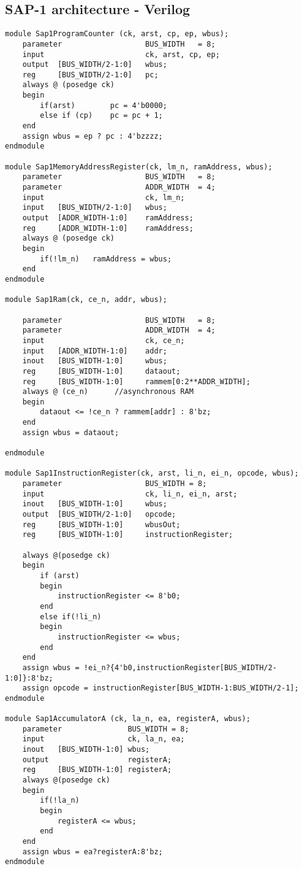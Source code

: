 \subsection{SAP-1 architecture - Verilog}
\lstset{language=Verilog,style=Verilogstyle}
\begin{lstlisting}[caption={SAP-1 architecture implemented in C},label=lst:sap1archverilog]
module Sap1ProgramCounter (ck, arst, cp, ep, wbus);
	parameter 					BUS_WIDTH 	= 8;
	input 						ck, arst, cp, ep;
	output	[BUS_WIDTH/2-1:0]	wbus;
	reg		[BUS_WIDTH/2-1:0]	pc;
	always @ (posedge ck)
	begin
		if(arst)		pc = 4'b0000;
		else if (cp)	pc = pc + 1;
	end
	assign wbus = ep ? pc : 4'bzzzz;
endmodule

module Sap1MemoryAddressRegister(ck, lm_n, ramAddress, wbus);
	parameter 					BUS_WIDTH 	= 8;
	parameter 					ADDR_WIDTH 	= 4;
	input 						ck, lm_n;
	input	[BUS_WIDTH/2-1:0]	wbus;
	output	[ADDR_WIDTH-1:0]	ramAddress;
	reg		[ADDR_WIDTH-1:0]	ramAddress;
	always @ (posedge ck)
	begin 
		if(!lm_n)	ramAddress = wbus;
	end
endmodule 

module Sap1Ram(ck, ce_n, addr, wbus);

	parameter 					BUS_WIDTH	= 8;
	parameter 					ADDR_WIDTH	= 4;
	input 						ck, ce_n;
	input	[ADDR_WIDTH-1:0]	addr;
	inout	[BUS_WIDTH-1:0] 	wbus;
	reg		[BUS_WIDTH-1:0] 	dataout;
	reg		[BUS_WIDTH-1:0] 	rammem[0:2**ADDR_WIDTH];
	always @ (ce_n)      //asynchronous RAM
	begin 
		dataout <= !ce_n ? rammem[addr] : 8'bz;
	end
	assign wbus = dataout;

endmodule

module Sap1InstructionRegister(ck, arst, li_n, ei_n, opcode, wbus);
	parameter 					BUS_WIDTH = 8;
	input 						ck, li_n, ei_n, arst;
	inout	[BUS_WIDTH-1:0] 	wbus;
	output	[BUS_WIDTH/2-1:0]	opcode;
	reg		[BUS_WIDTH-1:0]		wbusOut;
	reg		[BUS_WIDTH-1:0]		instructionRegister;
	
	always @(posedge ck)
	begin
		if (arst)
		begin 
			instructionRegister <= 8'b0;
		end
		else if(!li_n) 
		begin
			instructionRegister <= wbus;
		end
	end
	assign wbus = !ei_n?{4'b0,instructionRegister[BUS_WIDTH/2-1:0]}:8'bz;
	assign opcode = instructionRegister[BUS_WIDTH-1:BUS_WIDTH/2-1];
endmodule

module Sap1AccumulatorA (ck, la_n, ea, registerA, wbus);
	parameter 				BUS_WIDTH = 8;
	input 					ck, la_n, ea;
	inout	[BUS_WIDTH-1:0]	wbus;
	output 					registerA;
	reg		[BUS_WIDTH-1:0]	registerA;
	always @(posedge ck)
	begin 
		if(!la_n) 
		begin
			registerA <= wbus;
		end
	end
	assign wbus = ea?registerA:8'bz;
endmodule


\end{lstlisting}
